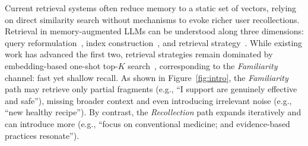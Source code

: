 Current retrieval systems often reduce memory to a static set of vectors, relying on direct similarity search without mechanisms to evoke richer user recollections. Retrieval in memory-augmented LLMs can be understood along three dimensions: query reformulation~\citep{li2025hello, zhao2025memocue, chen2025llm, shen2024retrieval, salama2025meminsight}, index construction~\citep{zhong2024memorybank, pan2025secom, xu2025towards, tan2025prospect, xu2025mem, ong2024towards,chhikara2025mem0}, and retrieval strategy~\citep{xu2021beyond}. While existing work has advanced the first two, retrieval strategies remain dominated by embedding-based one-shot top-$K$ search~\citep{karpukhin2020dense, lei2023unsupervised, wang2020minilm, song2020mpnet, luo2024bge}, corresponding to the \emph{Familiarity} channel: fast yet shallow recall. 
As shown in Figure~\ref{fig:intro}, the \emph{Familiarity} path may retrieve only partial fragments (e.g., ``I support are genuinely effective and safe''), missing broader context and even introducing irrelevant noise (e.g., ``new healthy recipe''). By contrast, the \emph{Recollection} path expands iteratively and can introduce more  (e.g., ``focus on conventional medicine; and evidence-based practices resonate''). 


